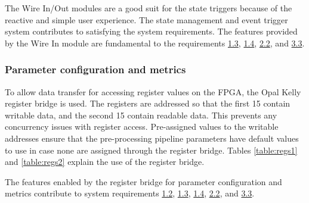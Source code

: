 \documentclass[12pt]{report}
\begin{document}
The Wire In/Out modules are a good suit for the state triggers because of the reactive and simple user experience.
The state management and event trigger system contributes to satisfying the system requirements. The features provided by the Wire In module are fundamental to the requirements \hyperref[req1.3]{1.3}, \hyperref[req1.4]{1.4}, \hyperref[req2.2]{2.2}, and \hyperref[req3.3]{3.3}.

\subsubsection{Parameter configuration and metrics}
To allow data transfer for accessing register values on the FPGA, the Opal Kelly register bridge is used. The registers are addressed so that the first 15 contain writable data, and the second 15 contain readable data. This prevents any concurrency issues with register access. Pre-assigned values to the writable addresses ensure that the pre-processing pipeline parameters have default values to use in case none are assigned through the register bridge. Tables \ref{table:regs1} and \ref{table:regs2} explain the use of the register bridge. 
\par
The features enabled by the register bridge for parameter configuration and metrics contribute to system requirements \hyperref[req1.2]{1.2}, \hyperref[req1.3]{1.3}, \hyperref[req1.4]{1.4}, \hyperref[req2.2]{2.2}, and \hyperref[req3.3]{3.3}.
\end{document}
